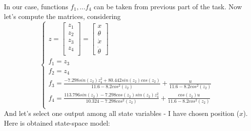 \documentclass[a4paper,12pt]{article}
\begin{document}
    In our case, functions $f_1, ... f_4$ can be taken from previous part of the
    task. Now let's compute the matrices, considering
    \begin{equation}
        \begin{cases}
        z = 
        \begin{bmatrix}
            z_1\\
            z_2\\
            z_3\\
            z_4\\
        \end{bmatrix} = 
        \begin{bmatrix}
            x\\
            \theta\\
            \dot x\\
            \dot \theta    
        \end{bmatrix}\\
        f_1 = z_3\\
        f_2 = z_4\\
        f_3 = \frac
        {- 7.298sin(z_2)z_4^2 + 80.442sin(z_2)cos(z_2)}
        {11.6 - 8.2cos^2(z_2)}
        +
        \frac{u}
        {11.6 - 8.2cos^2(z_2)}
        \\
        f_4 = \frac
        {113.796sin(z_2) - 7.298cos(z_2)sin(z_2)z_4^2}
        {10.324 - 7.298cos^2(z_2)}
        +
        \frac{cos(z_2)u}
        {11.6 - 8.2cos^2(z_2)}\\
        \end{cases}
    \end{equation}
    And let's select one output among all state variables - I have chosen position
    ($x$). Here is obtained state-space model:\\
\end{document}
